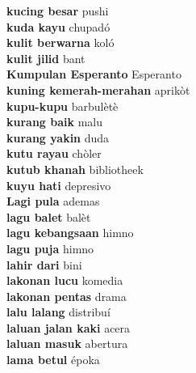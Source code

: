 \textbf{ kucing besar  } pushi \\
\textbf{ kuda kayu  } chupadó \\
\textbf{ kulit berwarna  } koló \\
\textbf{ kulit jilid  } bant \\
\textbf{ Kumpulan Esperanto  } Esperanto \\
\textbf{ kuning kemerah-merahan  } aprikòt \\
\textbf{ kupu-kupu  } barbulètè \\
\textbf{ kurang baik  } malu \\
\textbf{ kurang yakin  } duda \\
\textbf{ kutu rayau  } chòler \\
\textbf{ kutub khanah  } bibliotheek \\
\textbf{ kuyu hati  } depresivo \\
\textbf{ Lagi pula  } ademas \\
\textbf{ lagu balet  } balèt \\
\textbf{ lagu kebangsaan  } himno \\
\textbf{ lagu puja  } himno \\
\textbf{ lahir dari  } bini \\
\textbf{ lakonan lucu  } komedia \\
\textbf{ lakonan pentas  } drama \\
\textbf{ lalu lalang  } distribuí \\
\textbf{ laluan jalan kaki  } acera \\
\textbf{ laluan masuk  } abertura \\
\textbf{ lama betul  } époka \\
